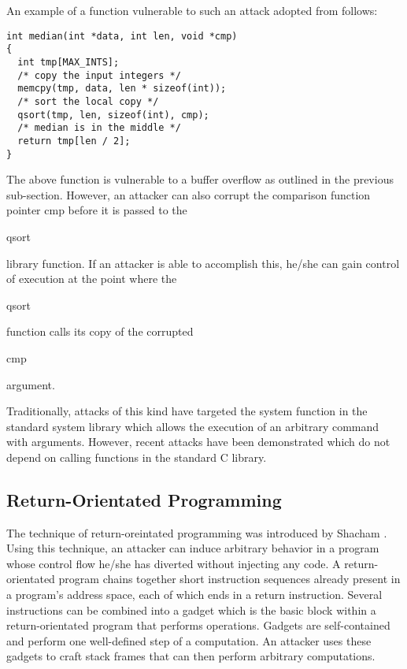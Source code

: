 An example of a function vulnerable to such an attack adopted from \cite{erlingsson-07} follows:

\begin{mylisting}
\begin{verbatim}
int median(int *data, int len, void *cmp)
{
  int tmp[MAX_INTS];
  /* copy the input integers */
  memcpy(tmp, data, len * sizeof(int));
  /* sort the local copy */
  qsort(tmp, len, sizeof(int), cmp);
  /* median is in the middle */
  return tmp[len / 2];
}
\end{verbatim}
\end{mylisting}

The above function is vulnerable to a buffer overflow as outlined in the previous sub-section.
However, an attacker can also corrupt the comparison function pointer cmp before it is passed to the
\begin{em}qsort\end{em} library function. If an attacker is able to accomplish this, he/she can gain control of
execution at the point where the \begin{em}qsort\end{em} function calls its copy of the corrupted
\begin{em}cmp\end{em} argument.

Traditionally, attacks of this kind have targeted the system function in the standard system library
which allows the execution of an arbitrary command with arguments. However, recent attacks have been
demonstrated which do not depend on calling functions in the standard C library. 

\subsection{Return-Orientated Programming}

The technique of return-oreintated programming was introduced by Shacham \cite{shacham2007geometry}. Using this
technique, an attacker can induce arbitrary behavior in a program whose control flow he/she has
diverted without injecting any code. A return-orientated program chains together short instruction
sequences already present in a program's address space, each of which ends in a return instruction.
Several instructions can be combined into a gadget which is the basic block within a
return-orientated program that performs operations. Gadgets are self-contained and perform one
well-defined step of a computation. An attacker uses these gadgets to craft stack frames that can
then perform arbitrary computations. 

